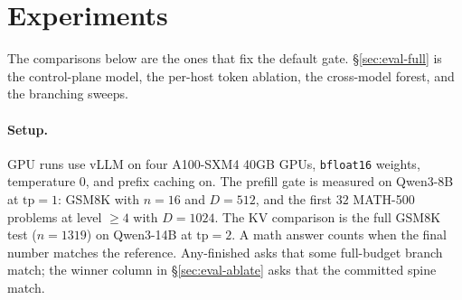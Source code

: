 \section{Experiments}
\label{sec:eval}

The comparisons below are the ones that fix the default gate.
\S\ref{sec:eval-full} is the control-plane model, the per-host token ablation, the cross-model forest, and the branching sweeps.

\paragraph{Setup.}
GPU runs use vLLM on four A100-SXM4 40GB GPUs, \texttt{bfloat16} weights, temperature $0$, and prefix caching on.
The prefill gate is measured on Qwen3-8B at $\mathrm{tp}{=}1$: GSM8K with $n{=}16$ and $D{=}512$, and the first $32$ MATH-500 problems at level $\ge 4$ with $D{=}1024$.
The KV comparison is the full GSM8K test ($n{=}1319$) on Qwen3-14B at $\mathrm{tp}{=}2$.
A math answer counts when the final number matches the reference.
Any-finished asks that some full-budget branch match; the winner column in \S\ref{sec:eval-ablate} asks that the committed spine match.

